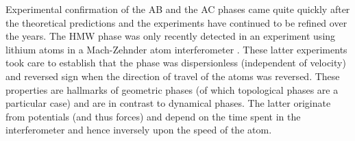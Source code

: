\documentclass[twocolumn,english,pra,aps,superscriptaddress,floatfix]{revtex4-1}
\begin{document}

Experimental confirmation of the AB \cite{chambers60,tonomura86,olariu85,peshkin89} and the AC  \cite{cimmino89,sangster93,zeiske95,gorlitz95,yanagimachi02} phases came quite quickly after the theoretical predictions and the experiments have continued to be refined over the years. The HMW phase was only recently detected in an experiment using lithium atoms in a Mach-Zehnder atom interferometer  \cite{vigue1,vigue2,vigue3,vigue4}. These latter experiments took care to establish that the phase was dispersionless (independent of velocity) and reversed sign when the direction of travel of the atoms was reversed. These properties are hallmarks of geometric phases (of which topological phases are a particular case) and are in contrast to dynamical phases. The latter originate from potentials (and thus forces) and depend on the time spent in the interferometer and hence inversely upon the speed of the atom. 
\end{document}
